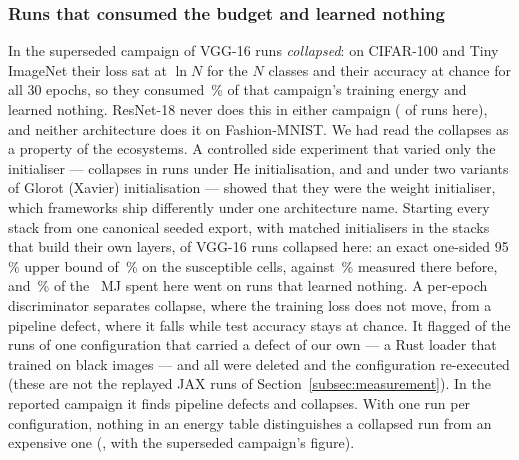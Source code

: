\begin{table}[t]
\centering
\caption{Median training energy (kJ) to first reach a target accuracy, with the
number of runs that reached it where that is not all \vRepetitions{};
``never'' marks a cell in which no run reached it. Each architecture is read on
its own. Targets: \vTargetFashion\,\%, \vTargetCifar\,\%, \vTargetTiny\,\%.}
\label{tab:energy_to_target}
{\footnotesize\setlength{\tabcolsep}{3pt}}
\end{table}


\subsubsection{Runs that consumed the budget and learned nothing}
\label{subsubsec:collapse}

In the superseded campaign \vCollapseFirstVgg{} of
\vCollapseFirstVggRuns{} VGG-16 runs \emph{collapsed}: on CIFAR-100 and Tiny
ImageNet their loss sat at $\ln N$ for the $N$ classes and their accuracy at
chance for all 30 epochs, so they consumed \vCollapseFirstWastedPct\,\% of that
campaign's training energy and learned nothing. ResNet-18 never does this in
either campaign (\vCollapsedResnet{} of \vCollapsedResnetRuns{} runs here), and
neither architecture does it on Fashion-MNIST. We had read the collapses as a
property of the ecosystems. A controlled side experiment that varied only the
initialiser --- \vInitCollapseHe{} collapses in \vInitCollapseTrials{} runs
under He initialisation, and \vInitCollapseGlorot{} and \vInitCollapseXavier{}
under two variants of Glorot (Xavier) initialisation --- showed that they were
the weight initialiser, which frameworks ship differently under one
architecture name. Starting every stack
from one canonical seeded export, with matched initialisers in the stacks that
build their own layers, \vCollapseRuns{} of \vCollapsedVggRuns{} VGG-16 runs
collapsed here: an exact one-sided 95\,\% upper bound of
\vCollapseRateUpperNinetyFive\,\% on the susceptible cells, against
\vCollapseFirstRateOverall\,\% measured there before, and \vWastedPct\,\% of the
\vTrainingEnergyMJ~MJ spent here went on runs that learned nothing. A per-epoch
discriminator separates collapse, where the training loss does not move, from a
pipeline defect, where it falls while test accuracy stays at chance. It flagged
\vDefectRuns{} of the \vRepetitions{} runs of one configuration that carried a
defect of our own --- a Rust loader that trained on black images --- and all
\vRepetitions{} were deleted and the configuration re-executed (these are not
the replayed JAX runs of Section~\ref{subsec:measurement}). In the reported
campaign it finds \vSigPipelineN{} pipeline defects and \vSigCollapseN{}
collapses. With one run per configuration,
nothing in an energy table distinguishes a collapsed run from an expensive one
(, with the superseded campaign's figure).


